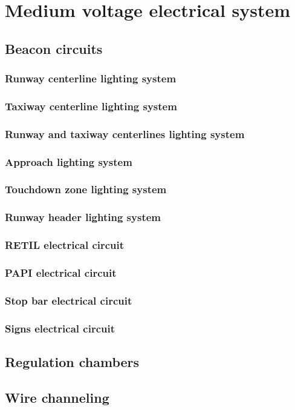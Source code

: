 \chapter{Medium voltage electrical system}

	\section{Beacon circuits}
		\subsection{Runway centerline lighting system}
		\subsection{Taxiway centerline lighting system}
		\subsection{Runway and taxiway centerlines lighting system}
		\subsection{Approach lighting system}
		\subsection{Touchdown zone lighting system}
		\subsection{Runway header lighting system}
		\subsection{RETIL electrical circuit}
		\subsection{PAPI electrical circuit}
		\subsection{Stop bar electrical circuit}
		\subsection{Signs electrical circuit}
		
	\section{Regulation chambers}
	
	\section{Wire channeling}
	

